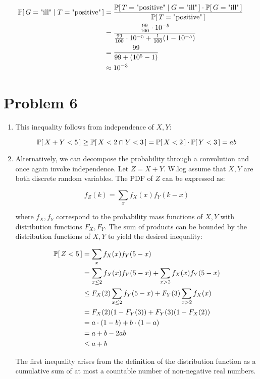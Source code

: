 \documentclass[12pt]{article}%
\begin{document}
\begin{align*}
  \mathbb{P}[\,G = \text{"ill"} \mid T = \text{"positive"}\,] & = \frac{\mathbb{P}[\,T = \text{"positive"} \mid G = \text{"ill"}\,] \cdot \mathbb{P}[\,G = \text{"ill"}\,]}{\mathbb{P}[\,T = \text{"positive"}\,]} \\
  & = \frac{\frac{99}{100} \cdot 10^{-5}}{\frac{99}{100} \cdot 10^{-5} + \frac{1}{100}(1- 10^{-5})} \\
  & = \frac{99}{99 + (10^5 - 1)}  \\
  & \approx 10^{-3}
\end{align*}

\section{Problem 6}
\begin{enumerate}
  \item This inequality follows from independence of $X,Y$:

  \[ \mathbb{P}[\,X + Y < 5\,] \geq \mathbb{P}[\,X < 2 \cap Y < 3\,]  = \mathbb{P}[\,X < 2\,] \cdot\mathbb{P}[\,Y < 3\,] = ab\]

  \item

  Alternatively, we can decompose the probability through a convolution and once again invoke independence. Let $Z = X+Y$. W.log assume that $X,Y$ are both discrete random variables. The PDF of $Z$ can be expressed as:

  $$f_Z(k) = \sum_{x} f_X(x)f_Y(k-x)$$

  where $f_X,f_Y$ correspond to the probability mass functions of $X,Y$ with distribution functions $F_X,F_Y$. The sum of products can be bounded by the distribution functions of $X,Y$ to yield the desired inequality:

  \begin{align*}
    \mathbb{P}[\,Z < 5\,] & =  \sum_{x} f_X(x)f_Y(5-x)\\
    & = \sum_{x \leq 2} f_X(x)f_Y(5-x) +  \sum_{x > 2} f_X(x)f_Y(5-x)\\
    & \leq F_X(2)\sum_{x \leq 2} f_Y(5-x) + F_Y(3) \sum_{x > 2} f_X(x)\\
    & = F_X(2)(1 - F_Y(3)) + F_Y(3)(1 - F_X(2))\\
    & =  a \cdot (1 - b) + b \cdot (1 - a)\\
    & = a + b - 2ab \\
    & \leq a + b
  \end{align*}

  The first inequality arises from the definition of the distribution function as a cumulative sum of at most a  countable number of non-negative real numbers.
\end{enumerate}
\end{document}
